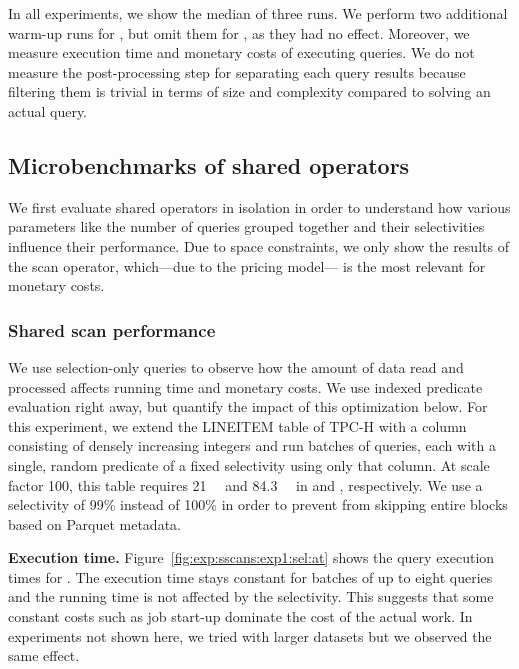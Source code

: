 In all experiments, we show the median of three runs. We perform two additional
warm-up runs for \athena, but omit them for \bigquery, as they had no effect.  
Moreover, we measure execution time and monetary costs of executing queries. We
do not measure the post-processing step for separating each query results
because filtering them is trivial in terms of size
and complexity compared to solving an actual query.


\subsection{Microbenchmarks of shared operators}
\label{sec:exp:sscan}

We first evaluate shared operators in isolation
in order to understand how various parameters
like the number of queries grouped together and their selectivities
influence their performance.
Due to space constraints,
we only show the results of the scan operator,
which---due to the pricing model---%
is the most relevant for monetary costs.


\subsubsection{Shared scan performance}
\label{sec:exp:sscan:impact_sel}

We use selection-only queries to observe how
the amount of data read and processed affects running time and monetary costs.
We use indexed predicate evaluation right away,
but quantify the impact of this optimization below.
For this experiment, we extend the LINEITEM table of TPC-H
with a column consisting of densely increasing integers
and run batches of queries,
each with a single, random predicate of a fixed selectivity using only that column.
At scale factor 100,
this table requires \SI{21}{\gibi\byte} and \SI{84.3}{\gibi\byte}
in \athena and \bigquery, respectively.
We use a selectivity of 99\% instead of 100\%
in order to prevent \athena
from skipping entire blocks based on Parquet metadata.

\textbf{Execution time.} Figure~\ref{fig:exp:sscans:exp1:sel:at} shows
the query execution times for \athena.
The execution time stays constant for batches of up to eight queries
and the running time is not affected by the selectivity.
This suggests that some constant costs such as job start-up
dominate the cost of the actual work.
In experiments not shown here, we tried with larger datasets
    but we observed the same effect.


